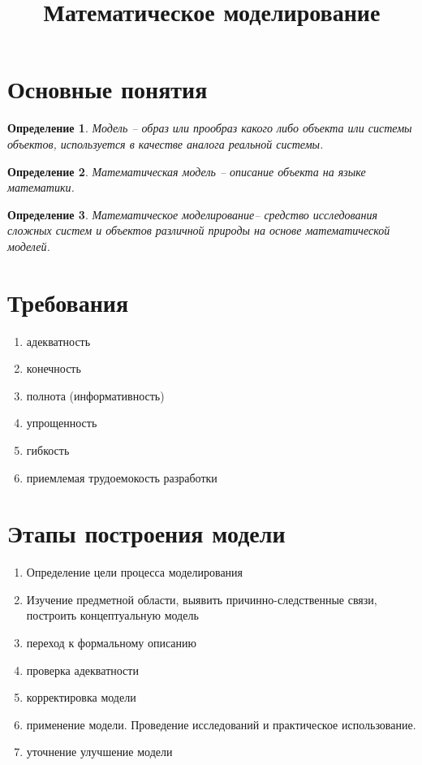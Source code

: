 \documentclass[14pt]{extarticle}
\title{Математическое моделирование}
\author{}
\date{}
\newtheorem{definition}{Определение}
\begin{document}
	\maketitle
	\section{Основные понятия}
	\begin{definition}
		Модель -- образ или прообраз какого либо
		объекта или системы объектов, используется
		в качестве аналога реальной системы.
	\end{definition}
	\begin{definition}
		Математическая модель -- описание
		объекта на языке математики.
	\end{definition}
	\begin{definition}
		Математическое моделирование--
		средство исследования сложных систем и объектов
		различной природы на основе математической моделей.

	\end{definition}
	\section{Требования}
	\begin{enumerate}
		\item адекватность
		\item конечность
		\item полнота (информативность)
		\item упрощенность
		\item гибкость
		\item приемлемая трудоемокость разработки
	\end{enumerate}
	\section{Этапы построения модели}
	\begin{enumerate}
		\item Определение цели процесса моделирования
		\item Изучение предметной области, выявить причинно-следственные связи, построить концептуальную модель
		\item переход к формальному описанию
		\item проверка адекватности
		\item корректировка модели
		\item применение модели. Проведение исследований и практическое использование.
		\item уточнение  улучшение модели
	\end{enumerate}
\end{document}

